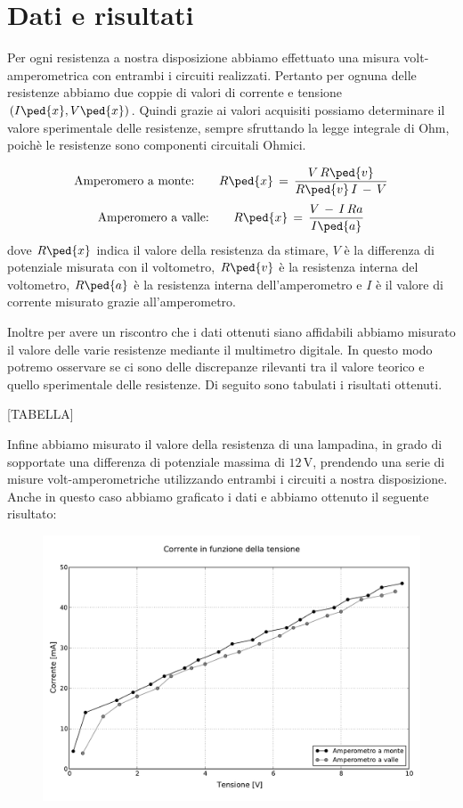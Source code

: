 \section*{Dati e risultati}

Per ogni resistenza a nostra disposizione abbiamo effettuato una misura volt-amperometrica con entrambi i circuiti realizzati. Pertanto per ognuna delle resistenze abbiamo due coppie di valori di corrente e tensione $(I\ped{x}, V\ped{x})$.
Quindi grazie ai valori acquisiti possiamo determinare il valore sperimentale delle resistenze, sempre sfruttando la legge integrale di Ohm, poichè le resistenze sono componenti circuitali Ohmici.

\begin{equation}
	\text{Amperomero a monte:} \qquad R\ped{x} \,=\, \frac{V\,R\ped{v}}{R\ped{v}\,I\,-\,V}
\end{equation}
\begin{equation}
	\text{Amperomero a valle:} \qquad R\ped{x} \,=\, \frac{V\,-\,I\,R{a}}{I\ped{a}}
\end{equation}
%
dove $R\ped{x}$ indica il valore della resistenza da stimare, $V$ è la differenza di potenziale misurata con il voltometro, $R\ped{v}$ è la resistenza interna del voltometro, $R\ped{a}$ è la resistenza interna dell'amperometro e $I$ è il valore di corrente misurato grazie all'amperometro.

Inoltre per avere un riscontro che i dati ottenuti siano affidabili abbiamo misurato il valore delle varie resistenze mediante il multimetro digitale. In questo modo potremo osservare se ci sono delle discrepanze rilevanti tra il valore teorico e quello sperimentale delle resistenze. Di seguito sono tabulati i risultati ottenuti.

[TABELLA]

Infine abbiamo misurato il valore della resistenza di una lampadina, in grado di sopportate una differenza di potenziale massima di $12\,\si{\volt}$, prendendo una serie di misure volt-amperometriche utilizzando entrambi i circuiti a nostra disposizione.
Anche in questo caso abbiamo graficato i dati e abbiamo ottenuto il seguente risultato:

\begin{figure}[hbtp]
        \centering
        \includegraphics[scale=0.55]{lampadina.pdf}
\end{figure}

